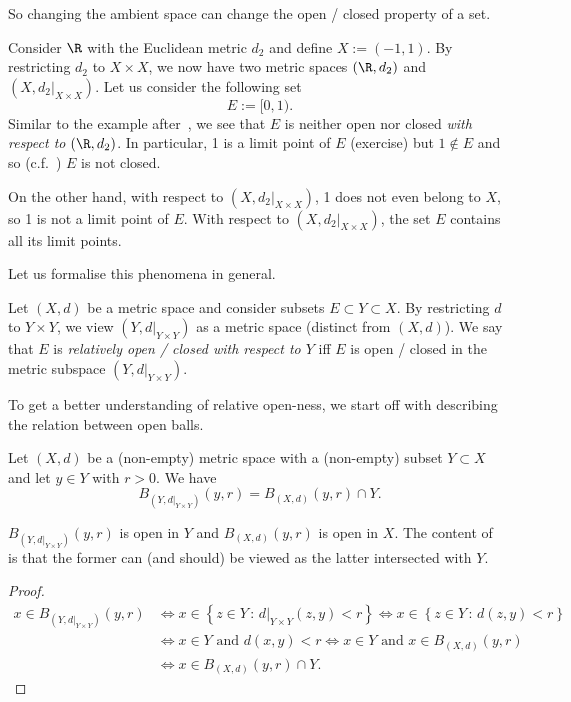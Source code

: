 So changing the ambient space can change the open / closed property of a set.
\begin{eg}[Subspaces of $\R$]
Consider $\R$ with the Euclidean metric $d_2$ and define $X := (-1,1)$. By restricting $d_2$ to $X\times X$, we now have two metric spaces $(\R,d_2)$ and $(X, \left.d_2\right|_{X\times X})$. Let us consider the following set
\[
E:= [0,1).
\]
Similar to the example after~, we see that $E$ is neither open nor closed \textit{with respect to $(\R,d_2)$}. In particular, 1 is a limit point of $E$ (exercise) but $1 \notin E$ and so (c.f.~) $E$ is not closed.

On the other hand, with respect to $(X,\left.d_2\right|_{X\times X})$, 1 does not even belong to $X$, so 1 is not a limit point of $E$. With respect to $(X,\left.d_2\right|_{X\times X})$, the set $E$ contains all its limit points.
\end{eg}
Let us formalise this phenomena in general.
\begin{defn}
\label{defn:rel_top}
Let $(X,d)$ be a metric space and consider subsets $E \subset Y \subset X$. By restricting $d$ to $Y\times Y$, we view $(Y,d|_{Y\times Y})$ as a metric space (distinct from $(X,d)$). We say that $E$ is \textit{relatively open / closed with respect to $Y$} iff $E$ is open / closed in the metric subspace $(Y,d|_{Y\times Y})$.
\end{defn}
To get a better understanding of relative open-ness, we start off with describing the relation between open balls.
\begin{lemma}
\label{lem:rel_ball}
Let $(X,d)$ be a (non-empty) metric space with a (non-empty) subset $Y\subset X$ and let $y \in Y$ with $r>0$. We have
\[
B_{(Y,d|_{Y\times Y})}(y,r) = B_{(X,d)}(y,r)\cap Y.
\]
\end{lemma}
$B_{(Y,d|_{Y\times Y})}(y,r)$ is open in $Y$ and $B_{(X,d)}(y,r)$ is open in $X$. The content of~ is that the former can (and should) be viewed as the latter intersected with $Y$.
\begin{proof}
\begin{align*}
x \in B_{(Y,d|_{Y\times Y})}(y,r) &\iff x\in \left\{
z \in Y \, : \, d|_{Y\times Y}(z,y)<r
\right\} \iff x\in \left\{
z \in Y \, : \, d(z,y)<r
\right\} 	\\
&\iff x \in Y \text{ and }d(x,y)<r 	\iff x \in Y\text{ and }x \in B_{(X,d)}(y,r) 	\\
&\iff x \in B_{(X,d)}(y,r) \cap Y.
\end{align*}
\end{proof}
